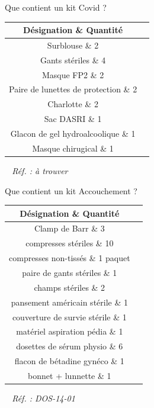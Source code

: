 \documentclass[grid,avery5371,landscape]{flashcards}
\makeatletter
\newcounter{nocarte}
\newcommand{\categ}[1]{%
  \def\@categ{#1}%
  \setcounter{nocarte}{0}%
}
\newcommand{\source}[1]{%
  \medskip
  \itshape%
   ~ \hfill Réf. : #1}
\makeatother
\begin{document}
\color[HTML]{01DFA5}
\categ{TECH}
\begin{flashcard}[matériel]{
 Que contient un kit Covid ?   }
  \begin{tabular}{c|c}
        Désignation \& Quantité \\ \hline
        Surblouse \& 2 \\
        Gants stériles \& 4 \\
        Masque FP2 \& 2 \\
        Paire de lunettes de protection \& 2 \\
        Charlotte \& 2 \\
        Sac DASRI \& 1 \\
        Glacon de gel hydroalcoolique \& 1 \\
        Masque chirugical \& 1
    \end{tabular}
  \source{à trouver}
\end{flashcard}


\color[HTML]{01DFA5}
\categ{TECH}
\begin{flashcard}[matériel]{
  Que contient un kit Accouchement ?   }
  \begin{tabular}{c|c}
        Désignation \& Quantité \\ \hline
        Clamp de Barr \& 3 \\
        compresses stériles \& 10 \\
        compresses non-tissés \& 1 paquet \\
        paire de gants stériles \& 1 \\
        champs stériles \& 2 \\
        pansement américain stérile \& 1 \\
        couverture de survie stérile \& 1 \\
        matériel aspiration pédia \& 1 \\
        dosettes de sérum physio \& 6 \\
        flacon de bétadine gynéco \& 1 \\
       bonnet + lunnette \& 1
    \end{tabular}
  \source{DOS-14-01 }
\end{flashcard}
\end{document}
